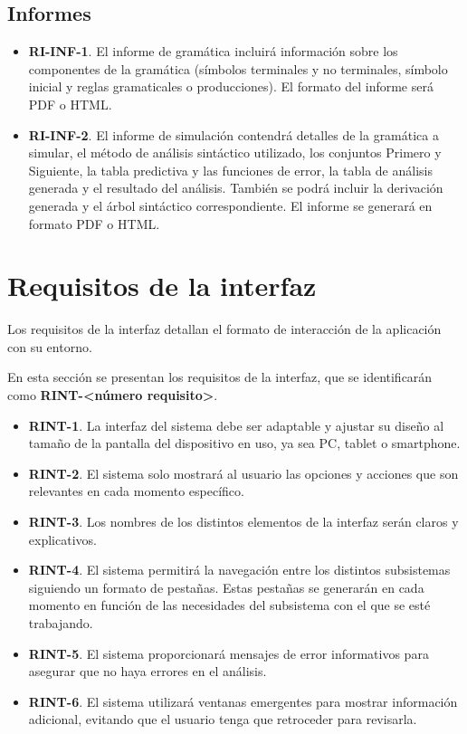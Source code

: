 \subsection{Informes}

\begin{itemize}
    \item \textbf{RI-INF-1}. El informe de gramática incluirá información sobre los componentes de la gramática (símbolos terminales y no terminales, símbolo inicial y reglas gramaticales o producciones). El formato del informe será PDF o HTML.
    \item  \textbf{RI-INF-2}. El informe de simulación contendrá detalles de la gramática a simular, el método de análisis sintáctico utilizado, los conjuntos Primero y Siguiente, la tabla predictiva y las funciones de error, la tabla de análisis generada y el resultado del análisis. También se podrá incluir la derivación generada y el árbol sintáctico correspondiente. El informe se generará en formato PDF o HTML.
\end{itemize}



\section{Requisitos de la interfaz}\label{sec:requisitos_interfaz}

Los requisitos de la interfaz detallan el formato de interacción de la aplicación con su entorno.

En esta sección se presentan los requisitos de la interfaz, que se identificarán como \textbf{RINT-<número requisito>}.

\begin{itemize}
    \item \textbf{RINT-1}. La interfaz del sistema debe ser adaptable y ajustar su diseño al tamaño de la pantalla del dispositivo en uso, ya sea PC, tablet o smartphone.
    \item \textbf{RINT-2}. El sistema solo mostrará al usuario las opciones y acciones que son relevantes en cada momento específico.
    \item \textbf{RINT-3}. Los nombres de los distintos elementos de la interfaz serán claros y explicativos.
    \item \textbf{RINT-4}. El sistema permitirá la navegación entre los distintos subsistemas siguiendo un formato de pestañas. Estas pestañas se generarán en cada momento en función de las necesidades del subsistema con el que se esté trabajando.
    \item \textbf{RINT-5}. El sistema proporcionará mensajes de error informativos para asegurar que no haya errores en el análisis.
    \item \textbf{RINT-6}. El sistema utilizará ventanas emergentes para mostrar información adicional, evitando que el usuario tenga que retroceder para revisarla.
\end{itemize}